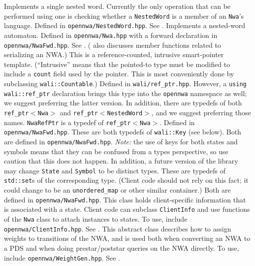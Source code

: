 \begin{functionlist}
   Implements a single nested word. Currently the only
    operation that can be performed using one is checking whether a
    \texttt{NestedWord} is a member of an \texttt{Nwa}'s language. Defined in
    \texttt{opennwa/NestedWord.hpp}. See .
   Implements a nested-word automaton. Defined in
    \texttt{opennwa/Nwa.hpp} with a forward declaration in \texttt{opennwa/NwaFwd.hpp}.
    See
    . ( also discusses member
    functions related to serializing an NWA.)
   This is a reference-counted, intrusive
    smart-pointer template. (``Intrusive'' means that the pointed-to type
    must be modified to include a \texttt{count} field used by the
    pointer. This is most conveniently done by subclassing
    \texttt{wali::Countable}.) Defined in
    \texttt{wali/ref\_ptr.hpp}. However, a \texttt{using wali::ref\_ptr}
    declaration brings this type into the \texttt{opennwa} namespace as well;
    we suggest preferring the latter version. In addition, there are typedefs of
    both \texttt{ref\_ptr$<$Nwa$>$} and \texttt{ref\_ptr$<$NestedWord$>$},
    and we suggest preferring those names.
   \texttt{NwaRefPtr} is a typedef of \texttt{ref\_ptr$<$Nwa$>$}.
    Defined in \texttt{opennwa/NwaFwd.hpp}.
   These are both typedefs of
    \texttt{wali::Key} (see below). Both are defined in
    \texttt{opennwa/NwaFwd.hpp}. \emph{Note:} the use of keys for both
    states and symbols means that they can be confused from a types
    perspective, so use caution that this does not happen. In addition, a
    future version of the library may change \texttt{State} and
    \texttt{Symbol} to be distinct types.
   These are typedefs of
    \texttt{std::set}s of the corresponding type. (Client code should not
    rely on this
    fact; it could change to be an \texttt{unordered\_map} or other similar
    container.) Both are defined in \texttt{opennwa/NwaFwd.hpp}.
   This class holds client-specific information that
    is associated with a state. Client code can subclass \texttt{ClientInfo} and use
    functions of the \texttt{Nwa} class to attach instances to states. To use,
    include \texttt{opennwa/ClientInfo.hpp}. See .
   This abstract class describes how to assign weights
    to transitions of the NWA, and is used both when converting an NWA to a
    PDS and when doing prestar/poststar queries on the NWA directly. To use,
    include \texttt{opennwa/WeightGen.hpp}. See .
\end{functionlist}


